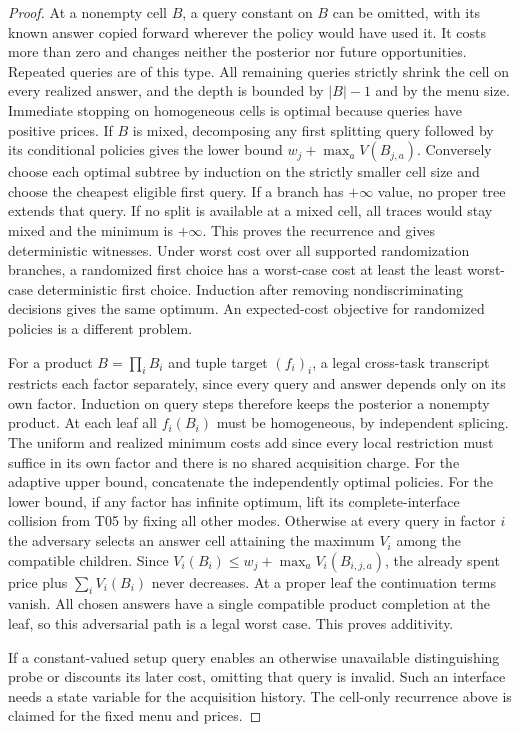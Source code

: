 \begin{proof}

At a nonempty cell \(B\), a query constant on \(B\) can be omitted, with its known answer copied forward wherever the policy would have used it. It costs more than zero and changes neither the posterior nor future opportunities. Repeated queries are of this type. All remaining queries strictly shrink the cell on every realized answer, and the depth is bounded by \(|B|-1\) and by the menu size. Immediate stopping on homogeneous cells is optimal because queries have positive prices. If \(B\) is mixed, decomposing any first splitting query followed by its conditional policies gives the lower bound \(w_j+\max_a V(B_{j,a})\). Conversely choose each optimal subtree by induction on the strictly smaller cell size and choose the cheapest eligible first query. If a branch has \(+\infty\) value, no proper tree extends that query. If no split is available at a mixed cell, all traces would stay mixed and the minimum is \(+\infty\). This proves the recurrence and gives deterministic witnesses. Under worst cost over all supported randomization branches, a randomized first choice has a worst-case cost at least the least worst-case deterministic first choice. Induction after removing nondiscriminating decisions gives the same optimum. An expected-cost objective for randomized policies is a different problem.

For a product \(B=\prod_i B_i\) and tuple target \((f_i)_i\), a legal cross-task transcript restricts each factor separately, since every query and answer depends only on its own factor. Induction on query steps therefore keeps the posterior a nonempty product. At each leaf all \(f_i(B_i)\) must be homogeneous, by independent splicing. The uniform and realized minimum costs add since every local restriction must suffice in its own factor and there is no shared acquisition charge. For the adaptive upper bound, concatenate the independently optimal policies. For the lower bound, if any factor has infinite optimum, lift its complete-interface collision from T05 by fixing all other modes. Otherwise at every query in factor \(i\) the adversary selects an answer cell attaining the maximum \(V_i\) among the compatible children. Since \(V_i(B_i)\le w_j+\max_a V_i(B_{i,j,a})\), the already spent price plus \(\sum_i V_i(B_i)\) never decreases. At a proper leaf the continuation terms vanish. All chosen answers have a single compatible product completion at the leaf, so this adversarial path is a legal worst case. This proves additivity.

If a constant-valued setup query enables an otherwise unavailable distinguishing probe or discounts its later cost, omitting that query is invalid. Such an interface needs a state variable for the acquisition history. The cell-only recurrence above is claimed for the fixed menu and prices.

\end{proof}

